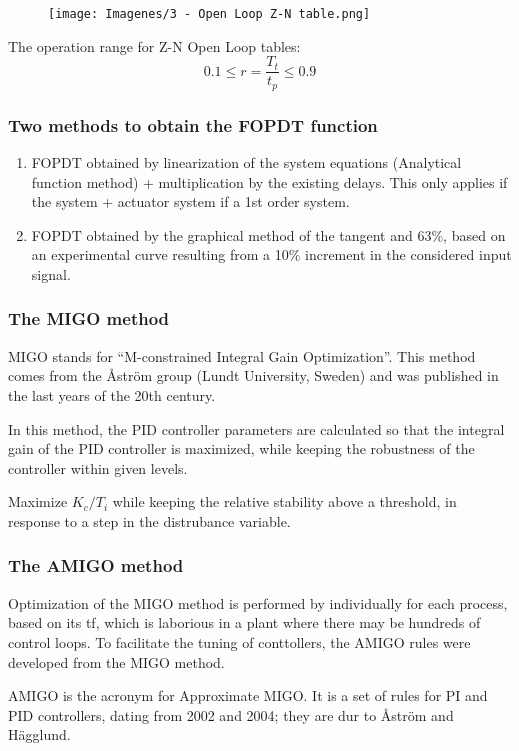 \begin{figure}[H]
    \centering
    \texttt{[image: Imagenes/3 - Open Loop Z-N table.png]}
\end{figure}

The operation range for Z-N Open Loop tables:
\[ 0.1 \leq r = \frac{T_t}{t_p} \leq 0.9 \]

\subsubsection{Two methods to obtain the FOPDT function}
\begin{enumerate}
    \item FOPDT obtained by linearization of the system equations (Analytical function method) + multiplication by the existing delays. This only applies if the system + actuator system if a 1st order system.
    \item FOPDT obtained by the graphical method of the tangent and 63\%, based on an experimental curve resulting from a 10\% increment in the considered input signal.
\end{enumerate}

\subsubsection{The MIGO method}
MIGO stands for ``M-constrained Integral Gain Optimization''. This method comes from the Åström group (Lundt University, Sweden) and was published in the last years of the 20th century.

In this method, the PID controller parameters are calculated so that the integral gain of the PID controller is maximized, while keeping the robustness of the controller within given levels.

Maximize $K_c/T_i$ while keeping the relative stability above a threshold, in response to a step in the distrubance variable.

\subsubsection{The AMIGO method}
Optimization of the MIGO method is performed by individually for each process, based on its tf, which is laborious in a plant where there may be hundreds of control loops. To facilitate the tuning of conttollers, the AMIGO rules were developed from the MIGO method.

AMIGO is the acronym for Approximate MIGO. It is a set of rules for PI and PID controllers, dating from 2002 and 2004; they are dur to Åström and Hägglund.

